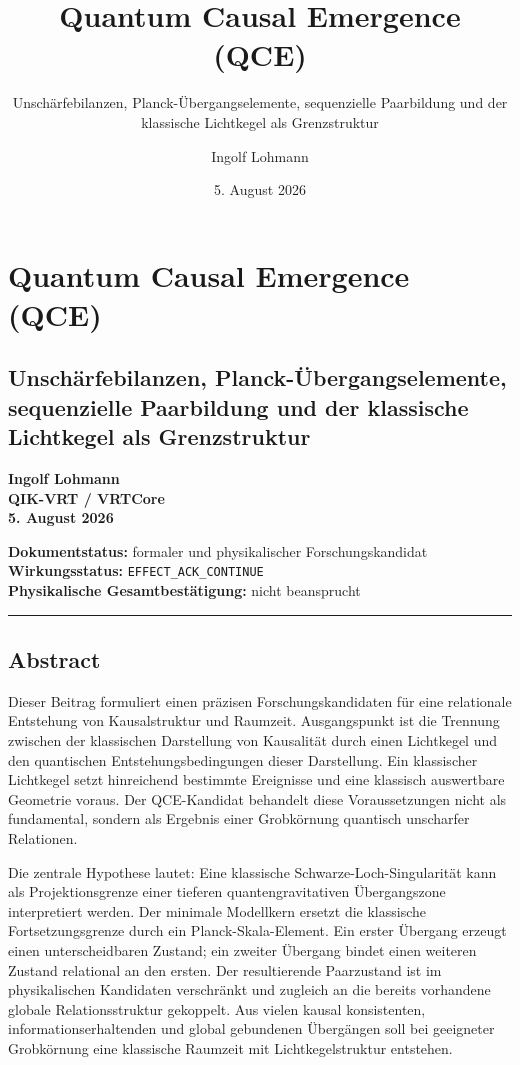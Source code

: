 \documentclass[
  11pt,
  a4paper,
]{article}
\title{Quantum Causal Emergence (QCE)}
\subtitle{Unschärfebilanzen, Planck-Übergangselemente, sequenzielle
Paarbildung und der klassische Lichtkegel als Grenzstruktur}
\author{Ingolf Lohmann}
\date{5. August 2026}
\begin{document}
\maketitle

{
\hypersetup{linkcolor=}
\setcounter{tocdepth}{3}
\tableofcontents
}
\section{Quantum Causal Emergence
(QCE)}\label{quantum-causal-emergence-qce}

\subsection{Unschärfebilanzen, Planck-Übergangselemente, sequenzielle
Paarbildung und der klassische Lichtkegel als
Grenzstruktur}\label{unschuxe4rfebilanzen-planck-uxfcbergangselemente-sequenzielle-paarbildung-und-der-klassische-lichtkegel-als-grenzstruktur}

\textbf{Ingolf Lohmann}\\
\textbf{QIK-VRT / VRTCore}\\
\textbf{5. August 2026}

\textbf{Dokumentstatus:} formaler und physikalischer
Forschungskandidat\\
\textbf{Wirkungsstatus:} \texttt{EFFECT\_ACK\_CONTINUE}\\
\textbf{Physikalische Gesamtbestätigung:} nicht beansprucht

\begin{center}\rule{0.5\linewidth}{0.5pt}\end{center}

\subsection{Abstract}\label{abstract}

Dieser Beitrag formuliert einen präzisen Forschungskandidaten für eine
relationale Entstehung von Kausalstruktur und Raumzeit. Ausgangspunkt
ist die Trennung zwischen der klassischen Darstellung von Kausalität
durch einen Lichtkegel und den quantischen Entstehungsbedingungen dieser
Darstellung. Ein klassischer Lichtkegel setzt hinreichend bestimmte
Ereignisse und eine klassisch auswertbare Geometrie voraus. Der
QCE-Kandidat behandelt diese Voraussetzungen nicht als fundamental,
sondern als Ergebnis einer Grobkörnung quantisch unscharfer Relationen.

Die zentrale Hypothese lautet: Eine klassische
Schwarze-Loch-Singularität kann als Projektionsgrenze einer tieferen
quantengravitativen Übergangszone interpretiert werden. Der minimale
Modellkern ersetzt die klassische Fortsetzungsgrenze durch ein
Planck-Skala-Element. Ein erster Übergang erzeugt einen unterscheidbaren
Zustand; ein zweiter Übergang bindet einen weiteren Zustand relational
an den ersten. Der resultierende Paarzustand ist im physikalischen
Kandidaten verschränkt und zugleich an die bereits vorhandene globale
Relationsstruktur gekoppelt. Aus vielen kausal konsistenten,
informationserhaltenden und global gebundenen Übergängen soll bei
geeigneter Grobkörnung eine klassische Raumzeit mit Lichtkegelstruktur
entstehen.
\end{document}
